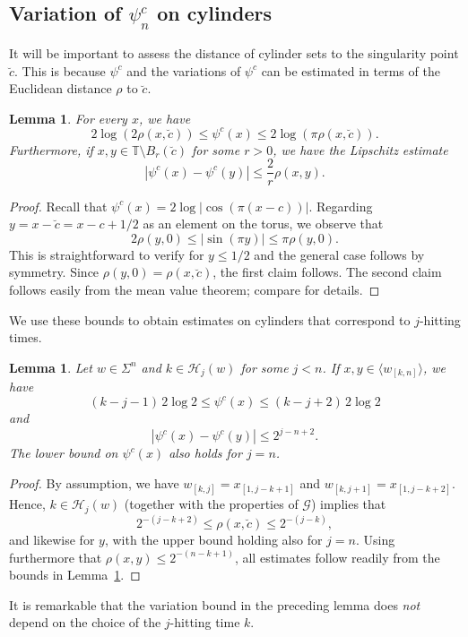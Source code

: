 \documentclass[11pt,reqno]{amsart}
\theoremstyle{plain}
\newtheorem{lemma}[theorem]{Lemma}
\theoremstyle{definition}
\newcommand{\mc}{\mathcal}
\begin{document}
\subsection{Variation of $\psi_n^c$ on cylinders}\label{subsec: Variation psi}

It will be important to assess the distance of cylinder sets to the singularity point $\breve{c}$.
This is because $\psi^c$ and the variations of $\psi^c$ can be estimated in terms of the Euclidean distance $\rho$ to $\breve{c}$.


\begin{lemma}
\label{LEM:psi-distance-bound}
For every $x$, we have
\[
2 \log (2 \rho(x,\breve{c})) \leqslant \psi^c(x)
\leqslant 2 \log (\pi \rho(x, \breve{c})).
\]
Furthermore, if $x,y \in \mathbb{T} \setminus B_r(\breve{c})$ for some $r>0$, we have the Lipschitz estimate
\[
|\psi^c(x) - \psi^c(y)| \leqslant \frac{2}{r} \rho(x,y).
\]
\end{lemma}

\begin{proof}
Recall that $\psi^c(x) = 2 \log | \cos(\pi (x-c))|$.
Regarding $y = x-\breve{c}= x- c+1/2$ as an element on the torus, we observe that 
\[
2\rho(y,0) \leqslant |\sin (\pi y)| \leqslant \pi \rho(y,0).
\]
This is straightforward to verify for $y\leqslant 1/2$ and the general case follows by symmetry. Since $\rho(y,0) = \rho(x,\breve{c})$, 
the first claim follows. The second claim follows easily from the mean value theorem; compare \cite[Lem.~4.1]{BGKS} for details.
\end{proof}

We use these bounds to obtain estimates on cylinders that correspond to $j$-hitting times.

\begin{lemma}
\label{LEM:psi-on-hitting}
Let $w \in \Sigma^n$ and $k \in \mc H_j(w)$ for some $j < n$. If $x,y \in \langle w_{[k,n]} \rangle$, we have
\[
(k-j-1)\, 2 \log 2
\leqslant \psi^c(x) \leqslant 
(k-j +2)\, 2 \log 2
\]
and
\[
|\psi^c(x) - \psi^c(y)|
\leqslant  2^{j-n + 2}.
\]
The lower bound on $\psi^c(x)$ also holds for $j=n$.
\end{lemma}

\begin{proof}
By assumption, we have $w_{[k,j]} = x_{[1,j-k+1]}$ and  $w_{[k,j+1]} =  x_{[1,j-k+2]}$. Hence, $k \in \mc H_j(w)$ (together with the properties of $\mc G$) implies that 
\[
2^{-(j-k+2)} \leqslant \rho(x,\breve{c}) \leqslant 2^{-(j-k)},
\]
and likewise for $y$, with the upper bound holding also for $j=n$. Using furthermore that $\rho(x,y) \leqslant 2^{-(n-k+1)}$, all estimates follow readily from the bounds in Lemma~\ref{LEM:psi-distance-bound}.
\end{proof}
It is remarkable that the variation bound in the preceding lemma does \emph{not} depend on the choice of the $j$-hitting time $k$.
\end{document}
